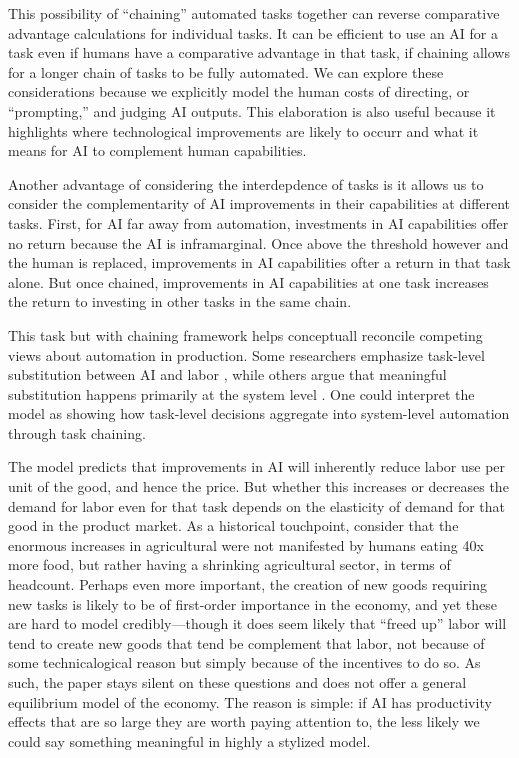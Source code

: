 \documentclass{article}
\begin{document}
This possibility of ``chaining'' automated tasks together can reverse comparative advantage calculations for individual tasks.
It can be efficient to use an AI for a task even if humans have a comparative advantage in that task, if chaining allows for a longer chain of tasks to be fully automated.
We can explore these considerations because we explicitly model the human costs of directing, or ``prompting,'' and judging AI outputs. 
This elaboration is also useful because it highlights where technological improvements are likely to occurr and what it means for AI to complement human capabilities.

Another advantage of considering the interdepdence of tasks is it allows us to consider the complementarity of AI improvements in their capabilities at different tasks.
First, for AI far away from automation, investments in AI capabilities offer no return because the AI is inframarginal.
Once above the threshold however and the human is replaced, improvements in AI capabilities ofter a return in that task alone. 
But once chained, improvements in AI capabilities at one task increases the return to investing in other tasks in the same chain.

This task but with chaining framework helps conceptuall reconcile competing views about automation in production. 
Some researchers emphasize task-level substitution between AI and labor \citep{autor2003skill, acemoglu2018automation}, while others argue that meaningful substitution happens primarily at the system level \citep{bresnahan2020artificial}. 
One could interpret the model as showing how task-level decisions aggregate into system-level automation through task chaining.

The model predicts that improvements in AI will inherently reduce labor use per unit of the good, and hence the price. 
But whether this increases or decreases the demand for labor even for that task depends on the elasticity of demand for that good in the product market.
As a historical touchpoint, consider that the enormous increases in agricultural were not manifested by humans eating 40x more food, but rather having a shrinking agricultural sector, in terms of headcount.
Perhaps even more important, the creation of new goods requiring new tasks is likely to be of first-order importance in the economy, and yet these are hard to model credibly---though it does seem likely that ``freed up'' labor will tend to create new goods that tend be complement that labor, not because of some technicalogical reason but simply because of the incentives to do so.
As such, the paper stays silent on these questions and does not offer a general equilibrium model of the economy.
The reason is simple: if AI has productivity effects that are so large they are worth paying attention to, the less likely we could say something meaningful in highly a stylized model.
\end{document}
